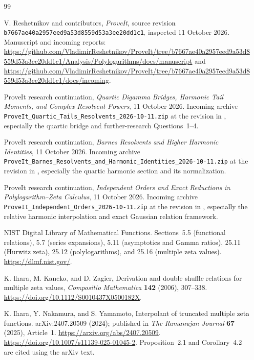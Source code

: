 \documentclass[11pt,a4paper]{article}
\numberwithin{equation}{section}
\theoremstyle{definition}
\theoremstyle{remark}
\begin{document}
\begin{thebibliography}{99}
\raggedright

V. Reshetnikov and contributors,
\emph{ProveIt}, source revision
\texttt{b7667ae40a2957eed9a53d8559d53a3ee20dd1c1},
inspected 11 October 2026.
Manuscript and incoming reports:
\url{https://github.com/VladimirReshetnikov/ProveIt/tree/b7667ae40a2957eed9a53d8559d53a3ee20dd1c1/Analysis/Polylogarithms/docs/manuscript}
and
\url{https://github.com/VladimirReshetnikov/ProveIt/tree/b7667ae40a2957eed9a53d8559d53a3ee20dd1c1/docs/incoming}.

ProveIt research continuation,
\emph{Quartic Digamma Bridges, Harmonic Tail Moments, and Complex
Resolvent Powers}, 11 October 2026.
Incoming archive
\texttt{ProveIt\_Quartic\_Tails\_Resolvents\_2026-10-11.zip}
at the revision in \cite{Repo}, especially the quartic bridge
and further-research Questions~1--4.

ProveIt research continuation,
\emph{Barnes Resolvents and Higher Harmonic Identities},
11 October 2026.
Incoming archive
\texttt{ProveIt\_Barnes\_Resolvents\_and\_Harmonic\_Identities\_2026-10-11.zip}
at the revision in \cite{Repo}, especially the quartic harmonic
section and its normalization.

ProveIt research continuation,
\emph{Independent Orders and Exact Reductions in
Polylogarithm--Zeta Calculus}, 11 October 2026.
Incoming archive
\texttt{ProveIt\_Independent\_Orders\_2026-10-11.zip}
at the revision in \cite{Repo}, especially the relative
harmonic interpolation and exact Gaussian relation framework.

NIST Digital Library of Mathematical Functions.
Sections~5.5 (functional relations), 5.7 (series expansions),
5.11 (asymptotics and Gamma ratios), 25.11 (Hurwitz zeta),
25.12 (polylogarithms), and 25.16 (multiple zeta values).
\url{https://dlmf.nist.gov/}.

K. Ihara, M. Kaneko, and D. Zagier,
Derivation and double shuffle relations for multiple zeta values,
\emph{Compositio Mathematica} \textbf{142} (2006), 307--338.
\url{https://doi.org/10.1112/S0010437X0500182X}.

K. Ihara, Y. Nakamura, and S. Yamamoto,
Interpolant of truncated multiple zeta functions.
arXiv:2407.20509 (2024); published in
\emph{The Ramanujan Journal} \textbf{67} (2025), Article~1.
\url{https://arxiv.org/abs/2407.20509}.
\url{https://doi.org/10.1007/s11139-025-01045-2}.
Proposition~2.1 and Corollary~4.2 are cited using the arXiv text.


\end{thebibliography}
\end{document}
